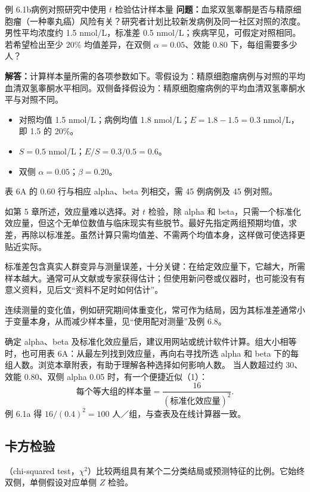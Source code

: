 \begin{bookbox}{例 6.1b\quad 病例对照研究中使用 $t$ 检验估计样本量}
\textbf{问题：}血浆双氢睾酮是否与精原细胞瘤（一种睾丸癌）风险有关？研究者计划比较新发病例及同一社区对照的浓度。男性平均浓度约 1.5 nmol/L，标准差 0.5 nmol/L；疾病罕见，可假定对照相同。若希望检出至少 20\% 均值差异，在双侧 $\alpha=0.05$、效能 0.80 下，每组需要多少人？

\textbf{解答：}计算样本量所需的各项参数如下。零假设为：精原细胞瘤病例与对照的平均血清双氢睾酮水平相同。双侧备择假设为：精原细胞瘤病例的平均血清双氢睾酮水平与对照不同。
\begin{itemize}
\item 对照均值 1.5 nmol/L；病例均值 1.8 nmol/L；$E=1.8-1.5=0.3$ nmol/L，即 1.5 的 20\%。
\item $S=0.5$ nmol/L；$E/S=0.3/0.5=0.6$。
\item 双侧 $\alpha=0.05$；$\beta=0.20$。
\end{itemize}
表 6A 的 0.60 行与相应 alpha、beta 列相交，需 45 例病例及 45 例对照。
\end{bookbox}
如第 5 章所述，效应量难以选择。对 $t$ 检验，除 alpha 和 beta，只需一个标准化效应量，但这个无单位数值与临床现实有些脱节。最好先指定两组预期均值，求差，再除以标准差。虽然计算只需均值差、不需两个均值本身，这样做可使选择更贴近实际。

标准差包含真实人群变异与测量误差，十分关键：在给定效应量下，它越大，所需样本越大。通常可从文献或专家获得估计；但使用新问卷或仪器时，也可能没有有意义资料，见后文“资料不足时如何估计”。

连续测量的变化值，例如研究期间体重变化，常可作为结局，因为其标准差通常小于变量本身，从而减少样本量，见“使用配对测量”及例 6.8。

确定 alpha、beta 及标准化效应量后，建议用网站或统计软件计算。组大小相等时，也可用表 6A：从最左列找到效应量，再向右寻找所选 alpha 和 beta 下的每组人数。浏览本章附表，有助于理解各种选择如何影响人数。
当人数超过约 30、效能 0.80、双侧 alpha 0.05 时，有一个便捷近似（1）：
\[
\text{每个等大组的样本量}=\frac{16}{(\text{标准化效应量})^2}.
\]
例 6.1a 得 $16/(0.4)^2=100$ 人／组，与查表及在线计算器一致。

\subsection{卡方检验}
（chi-squared test，$\chi^2$）比较两组具有某个二分类结局或预测特征的比例。它始终双侧，单侧假设对应单侧 $Z$ 检验。

